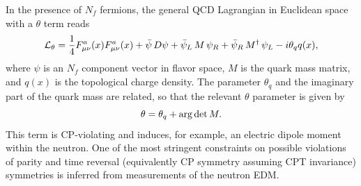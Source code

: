 \documentclass[aps,prc,twocolumn,showpacs,floatfix,nofootinbib,preprintnumbers,superscriptaddress,amsmath,amssymb]{revtex4-1}
\begin{document}
In the presence of $N_f$ fermions, the general QCD Lagrangian in Euclidean space with a $\theta$ term
reads
\begin{equation}
{\cal L_\theta}= {1\over 4} F_{\mu\nu}^a(x)F_{\mu\nu}^a(x)
+ \bar\psi\, D \psi
+ \bar\psi_L \,M\,\psi_R + \bar\psi_R \,M^\dagger\,\psi_L
- i \theta_q q(x),
\end{equation}
where $\psi$ is an $N_f$ component vector in flavor space, $M$ is the
quark mass matrix, and $q(x)$ is the topological charge density.  The parameter
$\theta_q$ and the imaginary part of the quark mass are related, so that the
relevant $\theta$ parameter is given by
\begin{equation}
\theta = \theta_q + {\rm arg}\,{\rm det}\, M.
\label{thetafe}
\end{equation} 
This term is CP-violating and induces, for example,  an electric dipole moment within the neutron.    
One of the most stringent constraints on possible violations of parity and time reversal 
(equivalently CP symmetry assuming CPT invariance) symmetries is inferred from
measurements of the neutron EDM.  
\end{document}
